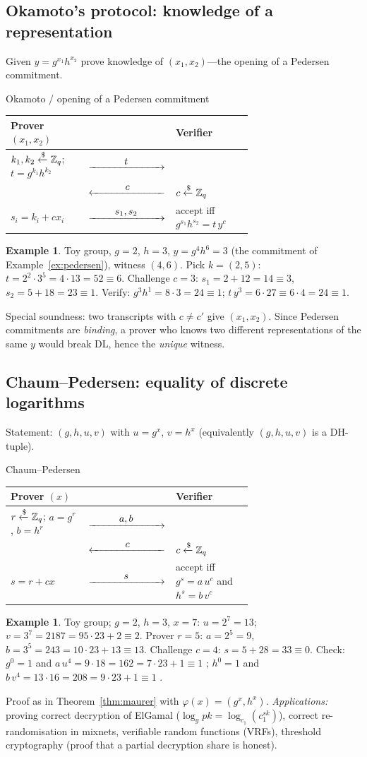 \documentclass[11pt,a4paper]{report}
\makeatletter
\theoremstyle{plain}
\theoremstyle{definition}
\newtheorem{example}[theorem]{Example}
\theoremstyle{remark}
\newcommand{\getsr}{\xleftarrow{\$}}
\newcommand{\ra}[1]{\xrightarrow{\makebox[2.5cm]{$#1$}}}
\newcommand{\la}[1]{\xleftarrow{\makebox[2.5cm]{$#1$}}}
\newenvironment{flow}[2]{%
  \par\smallskip\noindent
  \begin{tabular}{@{}L{0.34\linewidth} c L{0.34\linewidth}@{}}
  \textbf{#1} & & \textbf{#2}\\ \hline}{\end{tabular}\par\smallskip}
\makeatother
\begin{document}
\subsection{Okamoto's protocol: knowledge of a representation}
Given $y=g^{x_1}h^{x_2}$ prove knowledge of $(x_1,x_2)$---the opening of a Pedersen commitment.
\begin{protocol}[label=pr:okamoto]{Okamoto / opening of a Pedersen commitment}
\begin{flow}{Prover $(x_1,x_2)$}{Verifier}
$k_1,k_2\getsr\ZZ_q$; $t=g^{k_1}h^{k_2}$ & $\ra{t}$ & \\
 & $\la{c}$ & $c\getsr\ZZ_q$\\
$s_i=k_i+cx_i$ & $\ra{s_1,s_2}$ & accept iff $g^{s_1}h^{s_2}=t\,y^c$
\end{flow}
\end{protocol}
\begin{example}
Toy group, $g=2$, $h=3$, $y=g^4h^6=3$ (the commitment of Example~\ref{ex:pedersen}), witness $(4,6)$. Pick $k=(2,5)$: $t=2^2\cdot3^5=4\cdot13=52\equiv6$. Challenge $c=3$: $s_1=2+12=14\equiv3$, $s_2=5+18=23\equiv1$. Verify: $g^3h^1=8\cdot3=24\equiv1$; $t\,y^3=6\cdot27\equiv6\cdot4=24\equiv1$. \checkmark
\end{example}
Special soundness: two transcripts with $c\ne c'$ give $(x_1,x_2)$. Since Pedersen commitments are \emph{binding}, a prover who knows two different representations of the same $y$ would break DL, hence the \emph{unique} witness.

\subsection{Chaum--Pedersen: equality of discrete logarithms}
\label{sec:cp}
Statement: $(g,h,u,v)$ with $u=g^x$, $v=h^x$ (equivalently $(g,h,u,v)$ is a DH-tuple).
\begin{protocol}[label=pr:cp]{Chaum--Pedersen}
\begin{flow}{Prover $(x)$}{Verifier}
$r\getsr\ZZ_q$; $a=g^r$, $b=h^r$ & $\ra{a,b}$ & \\
 & $\la{c}$ & $c\getsr\ZZ_q$\\
$s=r+cx$ & $\ra{s}$ & accept iff $g^s=a\,u^c$ and $h^s=b\,v^c$
\end{flow}
\end{protocol}
\begin{example}
Toy group; $g=2$, $h=3$, $x=7$: $u=2^7=13$; $v=3^7=2187=95\cdot23+2\equiv2$. Prover $r=5$: $a=2^5=9$, $b=3^5=243=10\cdot23+13\equiv13$. Challenge $c=4$: $s=5+28=33\equiv0$. Check: $g^0=1$ and $a\,u^4=9\cdot18=162=7\cdot23+1\equiv1$ \checkmark; $h^0=1$ and $b\,v^4=13\cdot16=208=9\cdot23+1\equiv1$ \checkmark.
\end{example}
Proof as in Theorem~\ref{thm:maurer} with $\varphi(x)=(g^x,h^x)$. \emph{Applications:} proving correct decryption of ElGamal ($\log_gpk=\log_{c_1}(c_1^{sk})$), correct re-randomisation in mixnets, verifiable random functions (VRFs), threshold cryptography (proof that a partial decryption share is honest).
\end{document}
